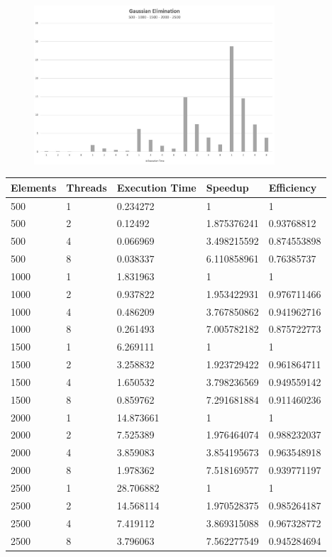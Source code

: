 \begin{figure}[H]
    \centering
    \includegraphics[width=0.8\textwidth]{graphics/Gaussian.jpg}
    \label{fig:Gaussian}
\end{figure}
\begin{table}[H]
    \centering
    \begin{tabular}{|l|l|l|l|l|}\hline
        Elements & Threads & Execution Time & Speedup & Efficiency \\\hline
        500 & 1 & 0.234272 & 1 & 1 \\
        500 & 2 & 0.12492 & 1.875376241 & 0.93768812\\
        500 & 4 & 0.066969 & 3.498215592 & 0.874553898\\
        500 & 8 & 0.038337 & 6.110858961 & 0.76385737\\\hline
        1000 & 1 & 1.831963 & 1 & 1\\
        1000 & 2 & 0.937822 & 1.953422931 & 0.976711466\\
        1000 & 4 & 0.486209 & 3.767850862 & 0.941962716\\
        1000 & 8 & 0.261493 & 7.005782182 & 0.875722773\\\hline
        1500 & 1 & 6.269111 & 1 & 1\\
        1500 & 2 & 3.258832 & 1.923729422 & 0.961864711\\
        1500 & 4 & 1.650532 & 3.798236569 & 0.949559142\\
        1500 & 8 & 0.859762 & 7.291681884 & 0.911460236\\\hline
        2000 & 1 & 14.873661 & 1 & 1\\
        2000 & 2 & 7.525389 & 1.976464074 & 0.988232037\\
        2000 & 4 & 3.859083 & 3.854195673 & 0.963548918\\
        2000 & 8 & 1.978362 & 7.518169577 & 0.939771197\\\hline
        2500 & 1 & 28.706882 & 1 & 1\\
        2500 & 2 & 14.568114 & 1.970528375 & 0.985264187\\
        2500 & 4 & 7.419112 & 3.869315088 & 0.967328772\\
        2500 & 8 & 3.796063 & 7.562277549 & 0.945284694\\\hline
    \end{tabular}
    \label{tab:Gaussian_Table}
\end{table}

